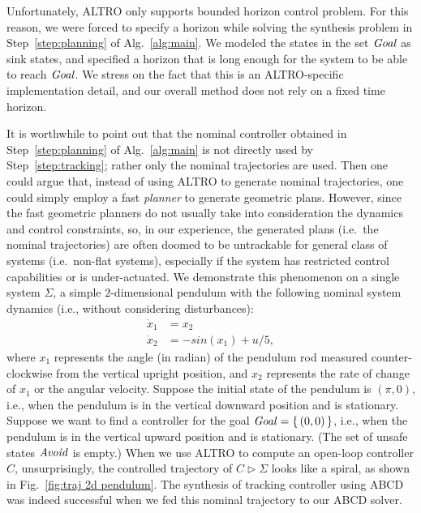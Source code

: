 \begin{remark}
	Unfortunately, ALTRO only supports bounded horizon control problem.
	For this reason, we were forced to specify a horizon while solving the synthesis problem in Step~\ref{step:planning} of Alg.~\ref{alg:main}.
	We modeled the states in the set $\mathit{Goal}$ as sink states, and specified a horizon that is long enough for the system to be able to reach $\mathit{Goal}$.
	We stress on the fact that this is an ALTRO-specific implementation detail, and our overall method does not rely on a fixed time horizon.
\end{remark}

\begin{remark}
	It is worthwhile to point out that the nominal controller obtained in Step~\ref{step:planning} of Alg.~\ref{alg:main} is not directly used by Step~\ref{step:tracking}; rather only the nominal trajectories are used.
	Then one could argue that, instead of using ALTRO to generate nominal trajectories, one could simply employ a fast \emph{planner} \cite{Kavraki1996rrt} to generate geometric plans.
	However, since the fast geometric planners do not usually take into consideration the dynamics and control constraints, so, in our experience, the generated plans (i.e.\ the nominal trajectories) are often doomed to be untrackable for general class of systems (i.e.\ non-flat systems), especially if the system has restricted control capabilities or is under-actuated.
	We demonstrate this phenomenon on a single system $\Sigma$, a simple $2$-dimensional pendulum with the following nominal system dynamics (i.e., without considering disturbances):
	\begin{align*}
		\dot{x}_1 &= x_2\\
		\dot{x}_2 &= -sin(x_1) + u/5,
	\end{align*}
	where $x_1$ represents the angle (in radian) of the pendulum rod measured counter-clockwise from the vertical upright position, and $x_2$ represents the rate of change of $x_1$ or the angular velocity.
	Suppose the initial state of the pendulum is $(\pi,0)$, i.e., when the pendulum is in the vertical downward position and is stationary.
	Suppose we want to find a controller for the goal $\mathit{Goal} = \set{(0,0)}$, i.e., when the pendulum is in the vertical upward position and is stationary.
	(The set of unsafe states $\mathit{Avoid}$ is empty.)
	When we use ALTRO to compute an open-loop controller $C$, unsurprisingly, the controlled trajectory of $C\triangleright \Sigma$ looks like a spiral, as shown in Fig.~\ref{fig:traj 2d pendulum}.
	The synthesis of tracking controller using ABCD was indeed successful when we fed this nominal trajectory to our ABCD solver.

\end{remark}
